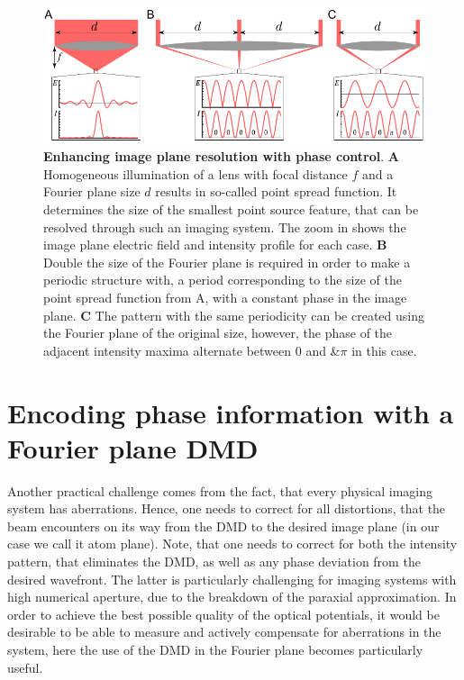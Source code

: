 \begin{figure}[t]
	\centering
	\includegraphics[scale=1]{figures/DMD_lens.pdf}
	\caption{{\bf Enhancing image plane resolution with phase control}. {\bf A} Homogeneous illumination of a lens with focal distance $f$ and a Fourier plane size $d$ results in so-called point spread function. It determines the size of the smallest point source feature, that can be resolved through such an imaging system. The zoom in shows the image plane electric field and intensity profile for each case. {\bf B} Double the size of the Fourier plane is required in order to make a periodic structure with, a period corresponding to the size of the point spread function from A, with a constant phase in the image plane. {\bf C} The pattern with the same periodicity can be created using the Fourier plane of the original size, however, the phase of the adjacent intensity maxima alternate between $0$ and &$\pi$ in this case.}
	\label{fig:DMD_lens}
\end{figure}

\section{Encoding phase information with a Fourier plane DMD}
Another practical challenge comes from the fact, that every physical imaging system has aberrations. Hence, one needs to correct for all distortions, that the beam encounters on its way from the DMD to the desired image plane (in our case we call it atom plane). Note, that one needs to correct for both the intensity pattern, that eliminates the DMD, as well as any phase deviation from the desired wavefront. The latter is particularly challenging for imaging systems with high numerical aperture, due to the breakdown of the paraxial approximation. In order to achieve the best possible quality of the optical potentials, it would be desirable to be able to measure and actively compensate for aberrations in the system, here the use of the DMD in the Fourier plane becomes particularly useful.

